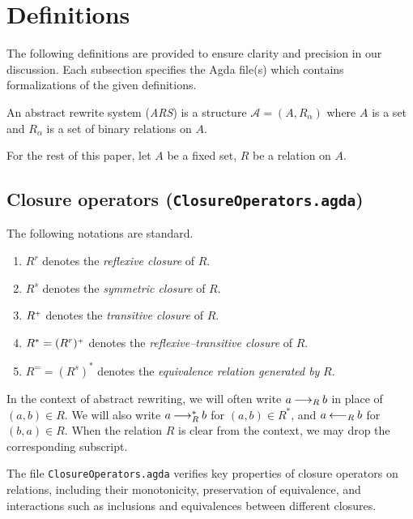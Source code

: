 \section{Definitions}
\label{sec:Definitions}
The following definitions are provided to ensure clarity and precision
in our discussion. Each subsection specifies the Agda file(s) which contains formalizations of the given definitions.

\begin{definition}
    An abstract rewrite system (\emph{ARS}) is a structure $\mathcal{A} = (A, R_\alpha)$ where
     $A$ is a set and $R_\alpha$ is a set of binary relations on $A$.
\end{definition}

For the rest of this paper, let $A$ be a fixed set, $R$ be a relation on $A$.



\subsection{Closure operators (\texttt{ClosureOperators.agda})}

\begin{notation}
The following notations are standard.
  \begin{enumerate}
    \item $R^r$ denotes the \emph{reflexive closure} of $R$.
    \item $R^s$ denotes the \emph{symmetric closure} of $R$.
    \item ${R}^{\scriptscriptstyle{+}}$ denotes the \emph{transitive closure} of $R$.
    \item $R^* = (R^r){}^{\scriptscriptstyle{+}}$ denotes the \emph{reflexive--transitive closure} of $R$.
    \item $R^= = (R^s)^*$ denotes the \emph{equivalence relation generated by} $R$.
  \end{enumerate}
\end{notation}

In the context of abstract rewriting, we will often write $a \mathbin{\longrightarrow_R} b$
in place of $(a,b) \in R$.  We will also write $a \mathbin{\longrightarrow_R^*} b$ for $(a,b) \in R^*$, and
$a \mathbin{\longleftarrow_R} b$ for $(b,a) \in R$.  When the relation $R$ is clear from the context,
we may drop the corresponding subscript.

The file \texttt{ClosureOperators.agda} verifies key properties of closure operators
on relations, including their monotonicity, preservation of equivalence, and interactions such as inclusions and equivalences between different closures.


